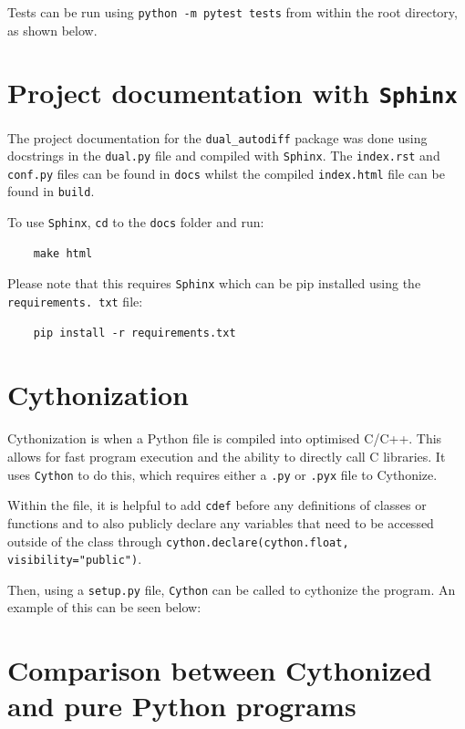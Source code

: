 \documentclass[11pt,a4paper]{article}
\begin{document}
Tests can be run using \texttt{python -m pytest tests} from within the root directory, as shown below.


\section{Project documentation with \texttt{\textbf{Sphinx}}}
The project documentation for the \texttt{dual\_autodiff} package was done using docstrings in the \texttt{dual.py} file and compiled with \texttt{Sphinx}. The \texttt{index.rst} and \texttt{conf.py} files can be found in \texttt{docs} whilst the compiled \texttt{index.html} file can be found in \texttt{build}.

To use \texttt{Sphinx}, \texttt{cd} to the \texttt{docs} folder and run:

\begin{lstlisting}
    make html
\end{lstlisting}

Please note that this requires \texttt{Sphinx} which can be pip installed using the \texttt{requirements. txt} file:

\begin{lstlisting}
    pip install -r requirements.txt
\end{lstlisting}
\section{Cythonization}
Cythonization is when a Python file is compiled into optimised C/C++. This allows for fast program execution and the ability to directly call C libraries. It uses \texttt{Cython} to do this, which requires either a \texttt{.py} or \texttt{.pyx} file to Cythonize.

Within the file, it is helpful to add \texttt{cdef} before any definitions of classes or functions and to also publicly declare any variables that need to be accessed outside of the class through \texttt{cython.declare(cython.float, visibility="public")}.

Then, using a \texttt{setup.py} file, \texttt{Cython} can be called to cythonize the program. An example of this can be seen below:



\section{Comparison between Cythonized and pure Python programs}
\end{document}
